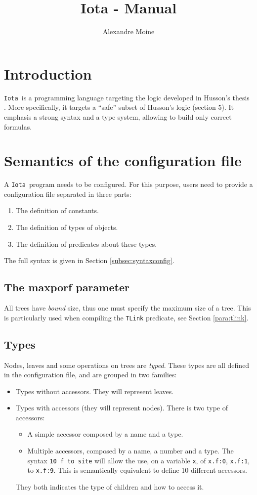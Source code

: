 \documentclass[10pt,a4paper]{article}
\author{Alexandre Moine}
\title{Iota - Manual}
\newcommand{\ocaml}{\texttt}
\newcommand{\Iota}{\texttt{Iota }}
\begin{document}
\maketitle
\tableofcontents

\section{Introduction}
\Iota is a programming language targeting the logic developed in Husson's thesis \cite{husson}. More specifically, it targets a ``safe'' subset of Husson's logic (section 5). It emphasis a strong syntax and a type system, allowing to build only correct formulas.

\section{Semantics of the configuration file}
A \Iota program needs to be configured. For this purpose, users need to provide a configuration file separated in three parts:
\begin{enumerate}
\item The definition of constants.
\item The definition of types of objects.
\item The definition of predicates about these types.
\end{enumerate}

The full syntax is given in Section \ref{subsec:syntaxconfig}.
\subsection{The maxporf parameter}
All trees have \emph{bound} size, thus one must specify the maximum size of a tree. This is particularly used when compiling the \ocaml{TLink} predicate, see Section \ref{para:tlink}.

\subsection{Types}
Nodes, leaves and some operations on trees are \emph{typed}. These types are all defined in the configuration file, and are grouped in two families:
\begin{itemize}
\item Types without accessors. They will represent leaves.
\item Types with accessors (they will represent nodes). There is two type of accessors:
  \begin{itemize}
  \item A simple accessor composed by a name and a type.
  \item Multiple accessors, composed by a name, a number and a type. The syntax \ocaml{10 f to site} will allow the use, on a variable \ocaml{x}, of \ocaml{x.f:0}, \ocaml{x.f:1}, to \ocaml{x.f:9}. This is semantically equivalent to define 10 different accessors.
  \end{itemize}
  They both indicates the type of children and how to access it.
\end{itemize}
\end{document}
